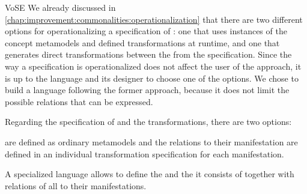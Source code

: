 \begin{copiedFrom}{VoSE}
We already discussed in \autoref{chap:improvement:commonalities:operationalization} that there are two different options for operationalizing a specification of \commonalities: one that uses instances of the concept metamodels and defined transformations at runtime, and one that generates direct transformations between the \concretemetamodels from the specification.
Since the way a specification is operationalized does not affect the user of the approach, it is up to the language and its designer to choose one of the options.
We chose to build a language following the former approach, because it does not limit the possible relations that can be expressed.

Regarding the specification of \conceptmetamodels and the transformations, there are two options:
\begin{description}[leftmargin=\parindent]
    \item[External concept definition:] \Conceptmetamodels are defined as ordinary metamodels and the relations to their manifestation are defined in an individual transformation specification %
    for each manifestation. %
    \item[Internal concept definition:] A specialized language allows to define the \conceptmetamodel and the \commonalities it consists of together with relations of all \commonalities to their manifestations. %
\end{description}


\end{copiedFrom}
